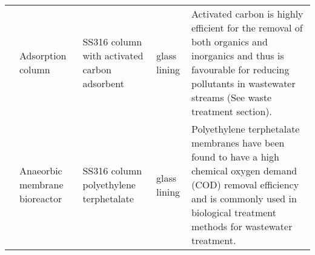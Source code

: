 \begin{table}[H]
\begin{tabular}{@{}p{2cm}|p{3cm}|p{2cm}|p{2cm}|p{5cm}@{}}
                                                      & Adsorption column                                         & SS316   column with activated carbon adsorbent & glass lining                                       & Activated   carbon is highly efficient for the removal of both organics and inorganics   and thus is favourable for reducing pollutants in wastewater streams (See   waste treatment section).                                                                             \\
                    & Anaeorbic membrane bioreactor                            & SS316   column polyethylene terphetalate                                                      & glass lining                                       & Polyethylene   terphetalate membranes have been found to have a high chemical oxygen demand   (COD) removal efficiency and is commonly used in biological treatment methods   for wastewater treatment.                                                   \\ \bottomrule
\end{tabular}
\end{table}